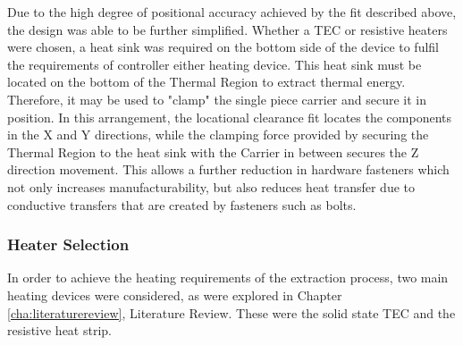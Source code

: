 Due to the high degree of positional accuracy achieved by the fit described above, the design was able to be further simplified. Whether a TEC or resistive heaters were chosen, a heat sink was required on the bottom side of the device to fulfil the requirements of controller either heating device. This heat sink must be located on the bottom of the Thermal Region to extract thermal energy. Therefore, it may be used to "clamp" the single piece carrier and secure it in position. In this arrangement, the locational clearance fit locates the components in the X and Y directions, while the clamping force provided by securing the Thermal Region to the heat sink with the Carrier in between secures the Z direction movement. This allows a further reduction in hardware fasteners which not only increases manufacturability, but also reduces heat transfer due to conductive transfers that are created by fasteners such as bolts.

\subsubsection{Heater Selection}
\label{sec:heaterselection}

In order to achieve the heating requirements of the extraction process, two main heating devices were considered, as were explored in Chapter \ref{cha:literaturereview}, Literature Review. These were the solid state TEC and the resistive heat strip.\\

